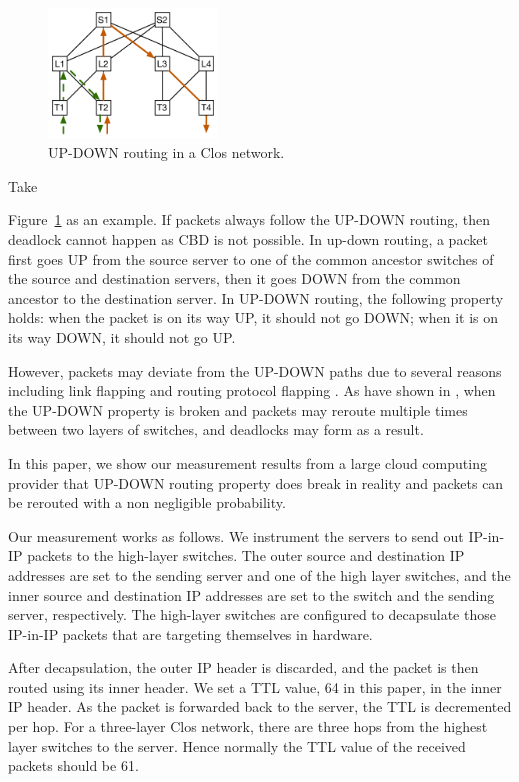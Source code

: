 \begin{figure}
	\centering
	\includegraphics[width=0.4\textwidth] {figs/up-down}
	\caption{UP-DOWN routing in a Clos network.}\label{fig:up-down}
\end{figure}

Take {Figure~\ref{fig:up-down} as an example. If packets always follow the UP-DOWN routing, then deadlock cannot
happen as CBD is not possible. In up-down routing, a packet first goes UP from the source server to one of the common ancestor switches of the source and destination servers, then it goes DOWN from the common ancestor to the destination server.
In UP-DOWN routing, the following property holds: when the packet is on its way UP, it should not go DOWN; when it is on its way DOWN, it should not go UP.

However, packets may deviate from the UP-DOWN paths due to several reasons including link flapping and routing protocol flapping \cite{f10}.
As have shown in \cite{shpiner2016unlocking}, when the UP-DOWN property is broken and packets may reroute multiple times between two layers of switches, and deadlocks may form as a result.

In this paper, we show our measurement results from a large cloud computing provider that UP-DOWN routing property does break in reality and packets can be rerouted with a non negligible probability.

Our measurement works as follows. We instrument the servers to send out IP-in-IP packets to the high-layer switches. The outer source and destination IP addresses are set to the sending server and one of the high layer switches, and the inner source and destination IP addresses are set to the switch and the sending server, respectively. The high-layer switches are configured to decapsulate those IP-in-IP packets that are targeting themselves in hardware.

After decapsulation, the outer IP header is discarded, and the packet is then routed using its inner header. We set a TTL value, 64 in this paper, in the inner IP header. As the packet is forwarded back to the server, the TTL is decremented per hop. For a three-layer Clos network, there are three hops from the highest layer switches to the server. Hence normally the TTL value of the received packets should be 61.

}
